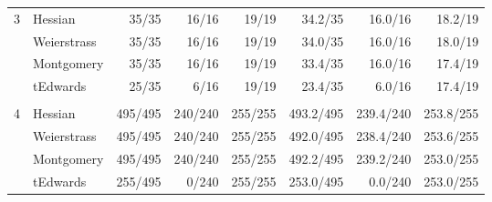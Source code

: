 \begin{table}[!h]
\begin{tabular}{llrrrrrr}
\multicolumn{1}{|l|}{\multirow{4}{*}{3}} & \multicolumn{1}{l|}{Hessian}                & \multicolumn{1}{r|}{35/35}   & \multicolumn{1}{r|}{16/16}   & \multicolumn{1}{r|}{19/19}   & \multicolumn{1}{r|}{34.2/35}   & \multicolumn{1}{r|}{16.0/16}   & \multicolumn{1}{r|}{18.2/19}   \\ \cline{2-8} 
\multicolumn{1}{|l|}{}                   & \multicolumn{1}{l|}{Weierstrass}            & \multicolumn{1}{r|}{35/35}   & \multicolumn{1}{r|}{16/16}   & \multicolumn{1}{r|}{19/19}   & \multicolumn{1}{r|}{34.0/35}   & \multicolumn{1}{r|}{16.0/16}   & \multicolumn{1}{r|}{18.0/19}   \\ \cline{2-8} 
\multicolumn{1}{|l|}{}                   & \multicolumn{1}{l|}{Montgomery}             & \multicolumn{1}{r|}{35/35}   & \multicolumn{1}{r|}{16/16}   & \multicolumn{1}{r|}{19/19}   & \multicolumn{1}{r|}{33.4/35}   & \multicolumn{1}{r|}{16.0/16}   & \multicolumn{1}{r|}{17.4/19}   \\ \cline{2-8} 
\multicolumn{1}{|l|}{}                   & \multicolumn{1}{l|}{tEdwards}               & \multicolumn{1}{r|}{25/35}   & \multicolumn{1}{r|}{6/16}    & \multicolumn{1}{r|}{19/19}   & \multicolumn{1}{r|}{23.4/35}   & \multicolumn{1}{r|}{6.0/16}    & \multicolumn{1}{r|}{17.4/19}   \\ \hline  \vspace{-3mm}
                                         &                                             &                              &                              &                              &                                &                                &                                \\ \hline
\multicolumn{1}{|l|}{\multirow{4}{*}{4}} & \multicolumn{1}{l|}{Hessian}                & \multicolumn{1}{r|}{495/495} & \multicolumn{1}{r|}{240/240} & \multicolumn{1}{r|}{255/255} & \multicolumn{1}{r|}{493.2/495} & \multicolumn{1}{r|}{239.4/240} & \multicolumn{1}{r|}{253.8/255} \\ \cline{2-8} 
\multicolumn{1}{|l|}{}                   & \multicolumn{1}{l|}{Weierstrass}            & \multicolumn{1}{r|}{495/495} & \multicolumn{1}{r|}{240/240} & \multicolumn{1}{r|}{255/255} & \multicolumn{1}{r|}{492.0/495} & \multicolumn{1}{r|}{238.4/240} & \multicolumn{1}{r|}{253.6/255} \\ \cline{2-8} 
\multicolumn{1}{|l|}{}                   & \multicolumn{1}{l|}{Montgomery}             & \multicolumn{1}{r|}{495/495} & \multicolumn{1}{r|}{240/240} & \multicolumn{1}{r|}{255/255} & \multicolumn{1}{r|}{492.2/495} & \multicolumn{1}{r|}{239.2/240} & \multicolumn{1}{r|}{253.0/255} \\ \cline{2-8} 
\multicolumn{1}{|l|}{}                   & \multicolumn{1}{l|}{tEdwards}               & \multicolumn{1}{r|}{255/495} & \multicolumn{1}{r|}{0/240}   & \multicolumn{1}{r|}{255/255} & \multicolumn{1}{r|}{253.0/495} & \multicolumn{1}{r|}{0.0/240}   & \multicolumn{1}{r|}{253.0/255} \\ \hline
\end{tabular}
\end{table}



